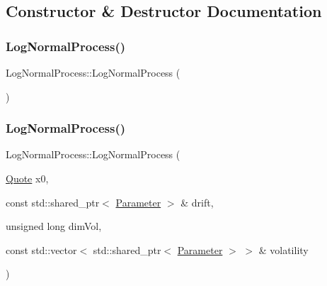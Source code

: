 \subsection{Constructor \& Destructor Documentation}
\hypertarget{class_log_normal_process_aef0d0728fe801074ee79abcf099e30e2}{}\label{class_log_normal_process_aef0d0728fe801074ee79abcf099e30e2} 
\subsubsection{\texorpdfstring{Log\+Normal\+Process()}{LogNormalProcess()}\hspace{0.1cm}{\footnotesize\ttfamily [1/2]}}
{\footnotesize\ttfamily Log\+Normal\+Process\+::\+Log\+Normal\+Process (\begin{DoxyParamCaption}{ }\end{DoxyParamCaption})\hspace{0.3cm}{\ttfamily [default]}}

\hypertarget{class_log_normal_process_ace234a1856730ea48978eaf3cb3f7a79}{}\label{class_log_normal_process_ace234a1856730ea48978eaf3cb3f7a79} 
\subsubsection{\texorpdfstring{Log\+Normal\+Process()}{LogNormalProcess()}\hspace{0.1cm}{\footnotesize\ttfamily [2/2]}}
{\footnotesize\ttfamily Log\+Normal\+Process\+::\+Log\+Normal\+Process (\begin{DoxyParamCaption}\item[{\hyperlink{_name_def_8h_a642a6c5fd87319d922637de0e0bb0305}{Quote}}]{x0,  }\item[{const std\+::shared\+\_\+ptr$<$ \hyperlink{class_parameter}{Parameter} $>$ \&}]{drift,  }\item[{unsigned long}]{dim\+Vol,  }\item[{const std\+::vector$<$ std\+::shared\+\_\+ptr$<$ \hyperlink{class_parameter}{Parameter} $>$ $>$ \&}]{volatility }\end{DoxyParamCaption})}



